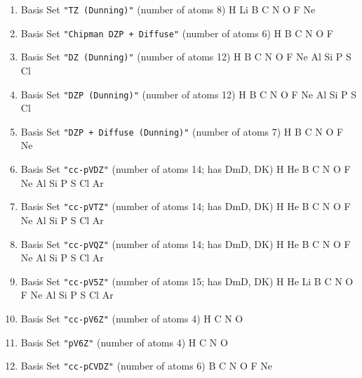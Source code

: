 \begin{enumerate}
\item Basis Set \verb#"TZ (Dunning)"# (number of atoms 8)  \newline 
  H Li B C N O F Ne


\item Basis Set \verb#"Chipman DZP + Diffuse"# (number of atoms 6)  \newline 
  H B C N O F


\item Basis Set \verb#"DZ (Dunning)"# (number of atoms 12)  \newline 
  H B C N O F Ne Al Si P S Cl


\item Basis Set \verb#"DZP (Dunning)"# (number of atoms 12)  \newline 
  H B C N O F Ne Al Si P S Cl


\item Basis Set \verb#"DZP + Diffuse (Dunning)"# (number of atoms 7)  \newline 
  H B C N O F Ne


\item Basis Set \verb#"cc-pVDZ"# (number of atoms 14; has DmD, DK)  \newline 
  H He B C N O F Ne Al Si P S Cl Ar


\item Basis Set \verb#"cc-pVTZ"# (number of atoms 14; has DmD, DK)  \newline 
  H He B C N O F Ne Al Si P S Cl Ar


\item Basis Set \verb#"cc-pVQZ"# (number of atoms 14; has DmD, DK)  \newline 
  H He B C N O F Ne Al Si P S Cl Ar


\item Basis Set \verb#"cc-pV5Z"# (number of atoms 15; has DmD, DK)  \newline 
  H He Li B C N O F Ne Al Si P S Cl Ar


\item Basis Set \verb#"cc-pV6Z"# (number of atoms 4)  \newline 
  H C N O


\item Basis Set \verb#"pV6Z"# (number of atoms 4)  \newline 
  H C N O


\item Basis Set \verb#"cc-pCVDZ"# (number of atoms 6)  \newline 
  B C N O F Ne



\end{enumerate}
